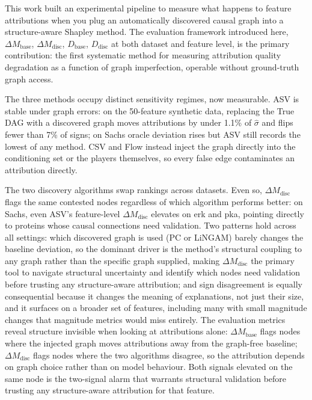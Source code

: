 \documentclass[12pt,letterpaper,twocolumn]{article}
\begin{document}
This work built an experimental pipeline to measure what happens to feature attributions
when you plug an automatically discovered causal graph into a structure-aware Shapley
method. The evaluation framework introduced here, $\Delta M_{\text{base}}$,
$\Delta M_{\text{disc}}$, $D_{\text{base}}$, $D_{\text{disc}}$ at both dataset and
feature level,  is the primary contribution: the first systematic method for measuring
attribution quality degradation as a function of graph imperfection, operable without
ground-truth graph access.

The three methods occupy distinct sensitivity regimes, now measurable. ASV is stable
under graph errors: on the 50-feature synthetic data, replacing the True DAG with a
discovered graph moves attributions by under 1.1\% of $\hat{\sigma}$ and flips fewer
than 7\% of signs; on Sachs oracle deviation rises but ASV still records the lowest of
any method. CSV and Flow instead inject the graph directly into the conditioning set or
the players themselves, so every false edge contaminates an attribution directly.

The two discovery algorithms swap rankings across datasets. Even so, $\Delta M_{\text{disc}}$
flags the same contested nodes regardless of which algorithm performs better: on Sachs,
even ASV's feature-level $\Delta M_{\text{disc}}$ elevates on erk and pka, pointing
directly to proteins whose causal connections need validation. Two patterns hold across all settings: which discovered graph is used
(PC or LiNGAM) barely changes the baseline deviation, so the dominant driver is the
method's structural coupling to any graph rather than the specific graph supplied, making
$\Delta M_{\text{disc}}$ the primary tool to navigate structural uncertainty and identify
which nodes need validation before trusting any structure-aware attribution; and sign
disagreement is equally consequential because it changes the meaning of explanations, not
just their size, and it surfaces on a broader set of features, including many with small
magnitude changes that magnitude metrics would miss entirely. The evaluation metrics
reveal structure invisible when looking at attributions alone: $\Delta M_{\text{base}}$
flags nodes where the injected graph moves attributions away from the graph-free
baseline; $\Delta M_{\text{disc}}$ flags nodes where the two algorithms disagree, so
the attribution depends on graph choice rather than on model behaviour. Both signals
elevated on the same node is the two-signal alarm that warrants structural validation
before trusting any structure-aware attribution for that feature.
\end{document}
